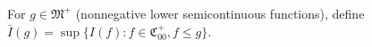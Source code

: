 For $g \in \mathfrak{M}^+$ (nonnegative lower semicontinuous functions), define $\bar{I}(g) = \sup\{I(f) : f \in \mathfrak{C}_{00}^+, f \leq g\}$.
